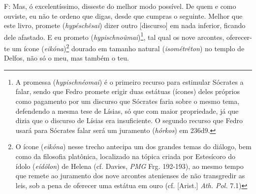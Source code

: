 F: Mas, ó excelentíssimo, disseste do melhor modo possível. De quem e
como ouviste, eu não te ordeno que digas, desde que cumpras o seguinte.
Melhor que este livro, promete (\emph{hypéschêsai}) dizer outro
{[}discurso{]} em nada inferior, ficando dele afastado. E eu prometo
(\emph{hypischnoûmai})\footnote{A promessa (\emph{hypischnéomai}) é o
  primeiro recurso para estimular Sócrates a falar, sendo que Fedro
  promete erigir duas estátuas (ícones) deles próprios como pagamento
  por um discurso que Sócrates faria sobre o mesmo tema, defendendo a
  mesma tese de Lísias, só que com maior propriedade, já que dizia que o
  discurso de Lísias era insuficiente. O segundo recurso que Fedro usará
  para Sócrates falar será um juramento (\emph{hórkos}) em 236d9.}, tal
qual os nove arcontes, oferecer-te um ícone (\emph{eikóna})\footnote{O
  ícone (\emph{eikóna}) nesse trecho antecipa um dos grandes temas do
  diálogo, bem como da filosofia platônica, localizado na tópica criada
  por Estesícoro do ídolo (\emph{eídôlon}) de Helena (cf. Davies,
  \emph{PMG} Frg. 192-193), ao mesmo tempo que remete ao juramento dos
  nove arcontes atenienses de não transgredir as leis, sob a pena de
  oferecer uma estátua em ouro (cf. {[}Arist.{]} \emph{Ath. Pol.} 7.1)}
dourado em tamanho natural (\emph{isométrêton}) no templo de Delfos, não
só o meu, mas também o teu.

